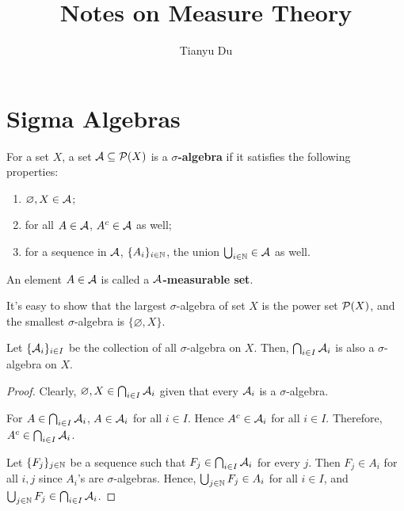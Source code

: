 \documentclass[11pt]{article}
\title{Notes on Measure Theory}
\author{Tianyu Du}
\newcommand{\s}[0]{$\sigma$}
\begin{document}
	\maketitle
	\tableofcontents
	\section{Sigma Algebras}
	\begin{definition}
		For a set $X$, a set $\mathcal{{A}} \subseteq \mathcal{{P}}(X)$ is a \textbf{\s-algebra} if it satisfies the following properties:
		\begin{enumerate}
			\item $\varnothing, X \in \mathcal{{A}}$;
			\item for all $A \in \mathcal{{A}}$, $A^c \in \mathcal{{A}}$ as well;
			\item for a sequence in $\mathcal{{A}}$, $\{A_i\}_{i\in\mathbb{N}}$, the union $\bigcup_{i\in\mathbb{N}} \in \mathcal{{A}}$ as well.
		\end{enumerate}
		An element $A \in \mathcal{{A}}$ is called a \textbf{$\mathcal{{A}}$-measurable set}.
	\end{definition}
	
	\begin{remark}
		It's easy to show that the largest \s-algebra of set $X$ is the power set $\mathcal{{P}}(X)$, and the smallest \s-algebra is $\{\varnothing, X\}$.
	\end{remark}
	
	\begin{theorem}
		Let $\{\mathcal{{A}}_i\}_{i \in I}$ be the collection of all $\sigma$-algebra on $X$. Then, $\bigcap_{i \in I} \mathcal{{A}}_i$ is also a $\sigma$-algebra on $X$.
	\end{theorem}
	
	\begin{proof}
		Clearly, $\varnothing, X \in \bigcap_{i \in I} \mathcal{{A}}_i$ given that every $\mathcal{{A}}_i$ is a \s-algebra.
		
		For $A \in \bigcap_{i \in I} \mathcal{{A}}_i$, $A \in \mathcal{{A}}_i$ for all $i \in I$. Hence $A^c \in \mathcal{{A}}_i$ for all $i \in I$. Therefore, $A^c \in \bigcap_{i \in I} \mathcal{{A}}_i$.
		
		Let $\{F_j\}_{j \in \mathbb{N}}$ be a sequence such that $F_j \in \bigcap_{i \in I} \mathcal{{A}}_i$ for every $j$. Then $F_j \in A_i$ for all $i, j$ since $A_i$'s are \s-algebras. Hence, $\bigcup_{j \in \mathbb{N}} F_j \in A_i$ for all $i \in I$, and $\bigcup_{j \in \mathbb{N}} F_j \in \bigcap_{i \in I} \mathcal{{A}}_i$.
	\end{proof}
	
\end{document}
